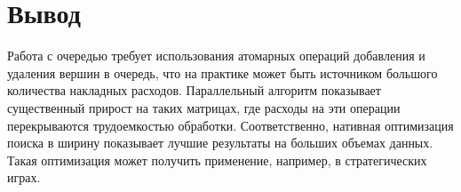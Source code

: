 \section{Вывод}\label{sec:exp-sum}
Работа с очередью требует использования атомарных операций добавления и удаления вершин в
очередь, что на практике может быть источником большого количества накладных расходов. Параллельный алгоритм показывает существенный прирост на таких матрицах, где расходы на эти операции перекрываются трудоемкостью обработки. Соответственно, нативная оптимизация поиска в ширину показывает лучшие результаты на больших объемах данных. Такая оптимизация может получить применение, например, в стратегических играх.